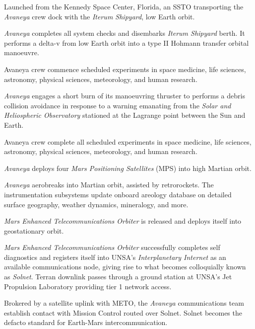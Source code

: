 Launched from the Kennedy Space Center, Florida, an SSTO transporting the {\it Avaneya} crew dock with the {\it Iterum Shipyard}, low Earth orbit.
\StopTimelineDate

{\it Avaneya} completes all system checks and disembarks {\it Iterum Shipyard} berth. It performs a delta-v from low Earth orbit into a type II Hohmann transfer orbital manoeuvre.
\StopTimelineDate

Avaneya crew commence scheduled experiments in space medicine, life sciences, astronomy, physical sciences, meteorology, and human research.
\StopTimelineDate

{\it Avaneya} engages a short burn of its manoeuvring thruster to performs a debris collision avoidance in response to a warning emanating from the {\it Solar and Heliospheric Observatory} stationed at the Lagrange  point between the Sun and Earth.
\StopTimelineDate

Avaneya crew complete all scheduled experiments in space medicine, life sciences, astronomy, physical sciences, meteorology, and human research.
\StopTimelineDate

{\it Avaneya} deploys four {\it Mars Positioning Satellites} (MPS) into high Martian orbit.
\StopTimelineDate

{\it Avaneya} aerobreaks into Martian orbit, assisted by retrorockets. The instrumentation subsystems update onboard areology database on detailed surface geography, weather dynamics, mineralogy, and more.

{\it Mars Enhanced Telecommunications Orbiter} is released and deploys itself into geostationary orbit.

{\it Mars Enhanced Telecommunications Orbiter} successfully completes self diagnostics and registers itself into UNSA's {\it Interplanetary Internet} as an available communications node, giving rise to what becomes colloquially known as {\it Solnet}. Terran downlink passes through a ground station at UNSA's Jet Propulsion Laboratory providing tier 1 network access.

Brokered by a satellite uplink with METO, the {\it Avaneya} communications team establish contact with Mission Control routed over Solnet. Solnet becomes the defacto standard for Earth-Mars intercommunication.
\StopTimelineDate

